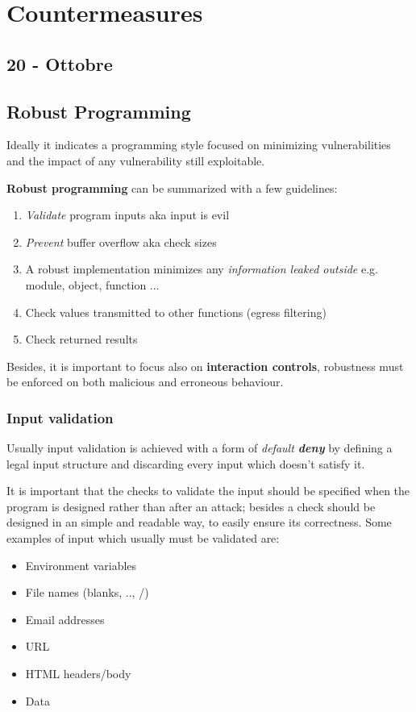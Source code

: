 \chapter{Countermeasures}
\section*{20 - Ottobre}
\section{Robust Programming}
Ideally it indicates a programming style focused on minimizing vulnerabilities and the impact of any vulnerability still exploitable.

\textbf{Robust programming} can be summarized with a few guidelines:
\begin{enumerate}
   \item \textit{Validate} program inputs aka input is evil
   \item \textit{Prevent} buffer overflow aka check sizes
   \item A robust implementation minimizes any \textit{information leaked outside} 
   e.g. module, object, function ...
   \item Check values transmitted to other functions (egress filtering)
   \item Check returned results
\end{enumerate}
Besides, it is important to focus also on \textbf{interaction controls},
robustness must be enforced on both malicious and erroneous behaviour.

\subsection{Input validation}
Usually input validation is achieved with a form of \textit{default \textbf{deny}} by defining a legal input structure and discarding every input which doesn't satisfy it.

It is important that the checks to validate the input should be specified when the program is designed rather than after an attack;
besides a check should be designed in an simple and readable way,
to easily ensure its correctness.
Some examples of input which usually must be validated are:
\begin{itemize}
   \item Environment variables
   \item File names (blanks, .., /)
   \item Email addresses
   \item URL
   \item HTML headers/body
   \item Data
\end{itemize} 

